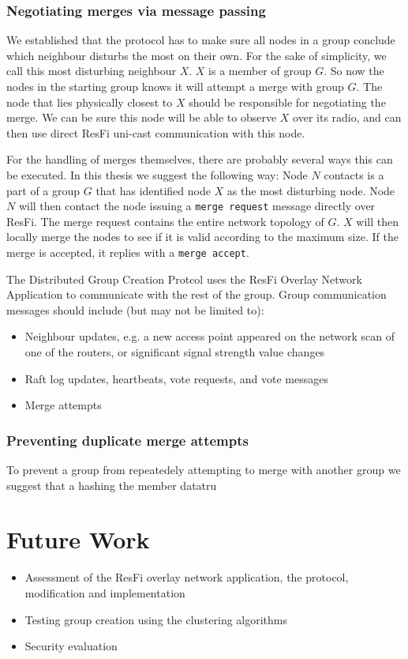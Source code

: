 \subsubsection{Negotiating merges via message passing}
We established that the protocol has to make sure all nodes in a group conclude which neighbour disturbs the most on their own.
For the sake of simplicity, we call this most disturbing neighbour $X$. $X$ is a member of group $G$. So now the nodes in the starting group knows it will attempt a merge with group $G$.
The node that lies physically closest to $X$ should be responsible for negotiating the merge.
We can be sure this node will be able to observe $X$ over its radio, and can then use direct ResFi uni-cast communication with this node. 

For the handling of merges themselves, there are probably several ways this can be executed. In this thesis we suggest the following way:
Node $N$ contacts is a part of a group $G$ that has identified node $X$ as the most disturbing node. Node $N$ will then contact the node issuing a \verb|merge request| message directly over ResFi.
The merge request contains the entire network topology of $G$. $X$ will then locally merge the nodes to see if it is valid according to the maximum size. If the merge is accepted, it replies with a \verb|merge accept|. 

The Distributed Group Creation Protcol uses the ResFi Overlay Network Application to communicate with the rest of the group. Group communication messages should include (but may not be limited to):
		\begin{itemize}
			\item Neighbour updates, e.g. a new access point appeared on the network scan of one of the routers, or significant signal strength value changes
			\item Raft log updates, heartbeats, vote requests, and vote messages
			\item Merge attempts 
			\end{itemize}


\subsubsection{Preventing duplicate merge attempts}
To prevent a group from repeatedely attempting to merge with another group we suggest that a hashing the member datatru

\section{Future Work}
\begin{itemize}
	\item Assessment of the ResFi overlay network application, the protocol, modification and implementation
	\item Testing group creation using the clustering algorithms
	\item Security evaluation

\end{itemize}


